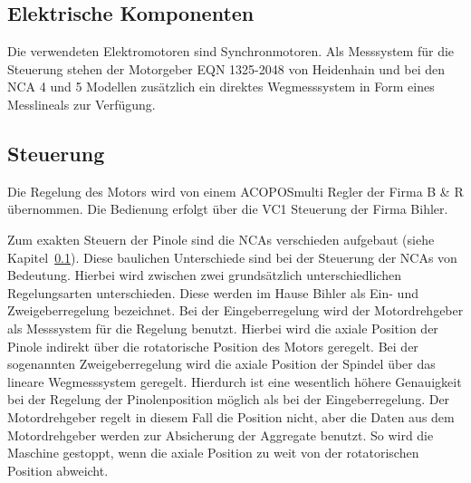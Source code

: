 \subsection{Elektrische Komponenten}\label{cha_Elektrische_Komponenten}

Die verwendeten Elektromotoren sind Synchronmotoren. Als Messsystem für die Steuerung stehen der Motorgeber EQN 1325-2048 von Heidenhain und bei den NCA 4 und 5 Modellen zusätzlich ein direktes Wegmesssystem in Form eines Messlineals zur Verfügung.









\subsection{Steuerung}\label{cha_Steuerung_Aufbau_NCA}

Die Regelung des Motors wird von einem ACOPOSmulti Regler der Firma B \& R übernommen. Die Bedienung erfolgt über die \gls{VC1} Steuerung der Firma Bihler.


Zum exakten Steuern der Pinole sind die NCAs verschieden aufgebaut (siehe Kapitel~\ref{cha_Elektrische_Komponenten}). Diese baulichen Unterschiede sind bei der Steuerung der NCAs von Bedeutung. Hierbei wird zwischen zwei grundsätzlich unterschiedlichen Regelungsarten unterschieden. Diese werden im Hause Bihler als Ein- und Zweigeberregelung bezeichnet. Bei der Eingeberregelung wird der Motordrehgeber als Messsystem für die Regelung benutzt. Hierbei wird die axiale Position der Pinole indirekt über die rotatorische Position des Motors geregelt. Bei der sogenannten Zweigeberregelung wird die axiale Position der Spindel über das lineare Wegmesssystem geregelt. Hierdurch ist eine wesentlich höhere Genauigkeit bei der Regelung der Pinolenposition möglich als bei der Eingeberregelung. Der Motordrehgeber regelt in diesem Fall die Position nicht, aber die Daten aus dem Motordrehgeber werden  zur Absicherung der Aggregate benutzt. So wird die Maschine gestoppt, wenn die axiale Position zu weit von der rotatorischen Position abweicht.



